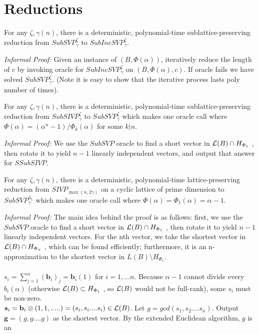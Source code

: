 \section{Reductions}
\begin{proposition}
	For any $\zeta, \gamma(n)$, there is a deterministic, polynomial-time sublattice-preserving
	reduction from $SubSVP_\gamma^\zeta$ to $SubIncSVP_\gamma^\zeta$.
\end{proposition}
\textit{Informal Proof:} Given an instance of $(B,\Phi(\alpha))$, iteratively reduce the length of $c$ by invoking oracle for $SubIncSVP_\gamma^\zeta$ on $(B,\Phi(\alpha),c)$. If oracle fails we have solved $SubSVP_\gamma^\zeta$. (Note it is easy to show that the iterative process lasts poly number of times).
\begin{proposition}
	For any $\zeta, \gamma(n)$, there is a deterministic, polynomial-time sublattice-preserving
	reduction from $SubSIVP_\gamma^\zeta$ to $SubSVP_\gamma^\zeta$ which makes one oracle call where $\Phi(\alpha) = (\alpha^n - 1)/\Phi_k(\alpha)$ for some $k | n$.
\end{proposition}
\textit{Informal Proof:} We use the $SubSVP$ oracle to find a
short vector in $\mathcal{L}(B) \cap H_{\Phi_1}$ , then rotate it to yield $n - 1$ linearly independent vectors, and output that answer for $SSubSIVP$.
\begin{proposition}
	For any $\zeta, \gamma(n)$, there is a deterministic, polynomial-time lattice-preserving
	reduction from $SIVP_{\max(n,2\gamma)}$ on a cyclic lattice of prime dimension to $SubSVP_\gamma^{\lambda_1}$ which makes one oracle call where $\Phi(\alpha) = \Phi_1(\alpha) = \alpha - 1$.
\end{proposition}
\textit{Informal Proof:} The main idea behind the proof is as follows: first, we use the $SubSVP$ oracle to find a
short vector in $\mathcal{L}(B) \cap H_{\Phi_1}$ , then rotate it to yield $n - 1$ linearly independent vectors. For the nth
vector, we take the shortest vector in $\mathcal{L}(B) \cap H_{\Phi_n}$ , which can be found efficiently; furthermore, it
is an n-approximation to the shortest vector in $L(B) \setminus H_{\Phi_1}.$
\\~\\
$s_i = \sum_{j=1}^n(\mathbf{b}_i)_j = \mathbf{b}_i(1)$ for $i = 1, . . . n$. Because $\alpha - 1$ cannot divide every $b_i(\alpha)$
(otherwise $\mathcal{L}(B) \subset H_{\Phi_1}$ , so $\mathcal{L}(B)$ would not be full-rank), some $s_i$ must be non-zero.
\\
$\mathbf{s}_i = \mathbf{b}_i \otimes (1,1,.....) = (s_i,s_i....s_i) \in \mathcal{L}(B)$. Let $g = gcd(s_1,s_2....s_n)$. Output $\mathbf{g} = (g,g....g)$ as the shortest vector. By the extended Euclidean algorithm, $g$ is an
